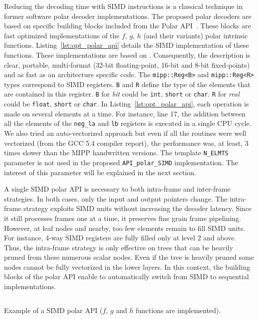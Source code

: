 Reducing the decoding time with SIMD instructions is a classical technique in
former software polar decoder implementations. The proposed polar decoders are
based on specific building blocks included from the Polar
API~\cite{Cassagne2015c,Cassagne2016b}. These blocks are fast optimized
implementations of the $f$, $g$, $h$ (and their variants) polar intrinsic
functions. Listing~\ref{lst:opt_polar_api} details the SIMD implementation of
these functions. These implementations are based on \MIPP. Consequently, the
description is clear, portable, multi-format (32-bit floating-point, 16-bit and
8-bit fixed-points) and as fast as an architecture specific code. The
\verb|mipp::Reg<B>| and \verb|mipp::Reg<R>| types correspond to SIMD registers.
\verb|B| and \verb|R| define the type of the elements that are contained in this
register. \verb|B| for \textit{bit} could be \verb|int|, \verb|short| or
\verb|char|. \verb|R| for \textit{real} could be \verb|float|, \verb|short| or
\verb|char|. In Listing~\ref{lst:opt_polar_api}, each operation is made on
several elements at a time. For instance, line 17, the addition between all the
elements of the \verb|neg_la| and \verb|lb| registers is executed in a single
CPU cycle. We also tried an auto-vectorized approach but even if all the
routines were well vectorized (from the GCC 5.4 compiler report), the
performance was, at least, 3 times slower than the MIPP handwritten versions.
The template \verb|N_ELMTS| parameter is not used in the proposed
\verb|API_polar_SIMD| implementation. The interest of this parameter will be
explained in the next section.

A single SIMD polar API is necessary to both intra-frame and inter-frame
strategies. In both cases, only the input and output pointers change. The
intra-frame strategy exploits SIMD units without increasing the decoder latency.
Since it still processes frames one at a time, it preserves fine grain
frame pipelining. However, at leaf nodes and nearby, too few elements remain to
fill SIMD units. For instance, 4-way SIMD registers are fully filled only at
level 2 and above. Thus, the intra-frame strategy is only effective on trees
that can be heavily pruned from these numerous scalar nodes. Even if the tree is
heavily pruned some nodes cannot be fully vectorized in the lower layers. In
this context, the building blocks of the polar API enable to automatically
switch from SIMD to sequential implementations.

\begin{listing}
  \inputminted[frame=lines,linenos]{C++}{\curChapter/src/polar/f_g_h_simd.cpp}
  \caption{Example of a \Cxx SIMD polar API ($f$, $g$ and $h$ functions are
    implemented).}
  \label{lst:opt_polar_api}
\end{listing}

